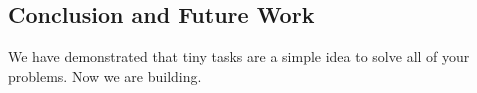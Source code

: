 \subsection{Conclusion and Future Work}
We have demonstrated that tiny tasks are a simple idea to solve all of your
problems. Now we are building.
